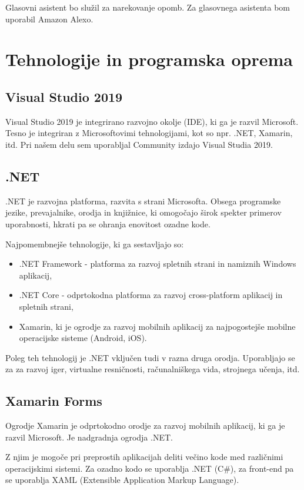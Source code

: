 \documentclass[a4paper, 12pt]{book}
\begin{document}
Glasovni asistent bo služil za narekovanje opomb.
Za glasovnega asistenta bom uporabil Amazon Alexo.

\chapter{Tehnologije in programska oprema}
\section{Visual Studio 2019}

Visual Studio 2019 je integrirano razvojno okolje (IDE), ki ga je razvil Microsoft.
Tesno je integriran z Microsoftovimi tehnologijami, kot so npr. .NET, Xamarin, itd. 
Pri našem delu sem uporabljal Community izdajo Visual Studia 2019.

\section{.NET}

.NET je razvojna platforma, razvita s strani Microsofta.
Obsega programske jezike, prevajalnike, orodja in knjižnice, ki omogočajo širok spekter primerov uporabnosti, hkrati pa se ohranja enovitost ozadne kode.

Najpomembnejše tehnologije, ki ga sestavljajo so:
\begin{itemize}
	\item .NET Framework - platforma za razvoj spletnih strani in namiznih Windows aplikacij, 
	\item .NET Core - odprtokodna platforma za razvoj cross-platform aplikacij in spletnih strani,
	\item Xamarin, ki je ogrodje za razvoj mobilnih aplikacij za najpogostejše mobilne operacijske sisteme (Android, iOS).
\end{itemize}

Poleg teh tehnologij je .NET vključen tudi v razna druga orodja.
Uporabljajo se za za razvoj iger, virtualne resničnosti, računalniškega vida, strojnega učenja, itd.

\section{Xamarin Forms}

Ogrodje Xamarin je odprtokodno orodje za razvoj mobilnih aplikacij, ki ga je razvil Microsoft. 
Je nadgradnja ogrodja .NET.

Z njim je mogoče pri preprostih aplikacijah deliti večino kode med različnimi operacijskimi sistemi. 
Za ozadno kodo se uporablja .NET (C\#), za front-end pa se uporablja XAML (Extensible Application Markup Language).
\end{document}
